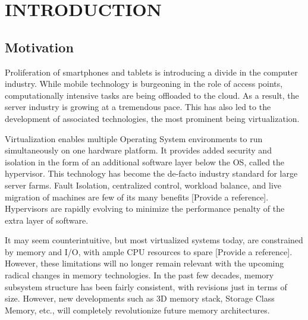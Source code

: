 %
%
%



\pagestyle{plain} %
\setcounter{page}{1}


\chapter{\uppercase {Introduction}}

\section{Motivation}
Proliferation of smartphones and tablets is introducing a divide in the computer industry. While mobile technology is burgeoning in the role of access points, computationally intensive tasks are being offloaded to the cloud. As a result, the server industry is growing at a tremendous pace. This has also led to the development of associated technologies, the most prominent being virtualization. 


Virtualization enables multiple Operating System environments to run simultaneously on one hardware platform. It provides added security and isolation in the form of an additional software layer below the OS, called the hypervisor. This technology has become the de-facto industry standard for large server farms. Fault Isolation, centralized control, workload balance, and live migration of machines are few of its many benefits [Provide a reference]. Hypervisors are rapidly evolving to minimize the performance penalty of the extra layer of software. 


It may seem counterintuitive, but most virtualized systems today, are constrained by memory and I/O, with ample CPU resources to spare [Provide a reference]. However, these limitations will no longer remain relevant with the upcoming radical changes in memory technologies. In the past few decades, memory subsystem structure has been fairly consistent, with revisions just in terms of size. However, new developments such as 3D memory stack, Storage Class Memory, etc., will completely revolutionize future memory architectures. 


